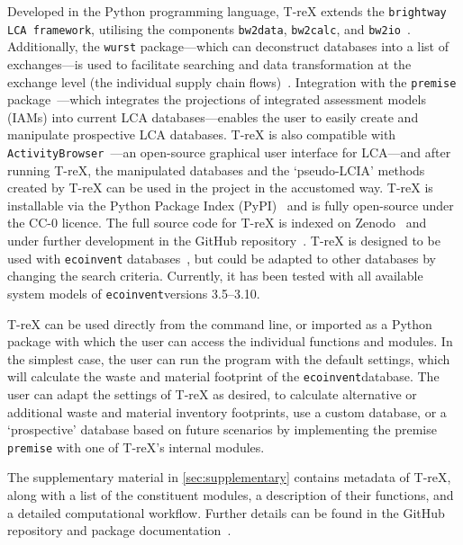 \documentclass[a4paper,fleqn]{cas-dc}
\begin{document}
Developed in the Python programming language, T-reX extends the \texttt{brightway LCA framework}, utilising the components \texttt{bw2data}, \texttt{bw2calc}, and \texttt{bw2io}~\citep{mutel2017brightway}. Additionally, the \texttt{wurst} package---which can deconstruct databases into a list of exchanges---is used to facilitate searching and data transformation at the exchange level (the individual supply chain flows)~\citep{mutel2017wurst}. Integration with the \texttt{premise} package~\citep{sacchi2022premise}---which integrates the projections of integrated assessment models (IAMs) into current LCA databases---enables the user to easily create and manipulate prospective LCA databases. T-reX is also compatible with \texttt{ActivityBrowser}~\citep{steubing2020activitybrowser}---an open-source graphical user interface for LCA---and after running T-reX, the manipulated databases and the `pseudo-LCIA' methods created by T-reX can be used in the project in the accustomed way. T-reX is installable via the Python Package Index (PyPI)~\citep{mcdowall2023T-reXpipy} and is fully open-source under the CC-0 licence. The full source code for T-reX is indexed on Zenodo~\citep{mcdowall2023T-reXzenodo} and under further development in the GitHub repository~\citep{mcdowall2024T-reXgithub}. T-reX is designed to be used with \texttt{ecoinvent} databases~\citep{ecoinvent2016version3}, but could be adapted to other databases by changing the search criteria. Currently, it has been tested with all available system models of \texttt{ecoinvent}versions 3.5--3.10.

T-reX can be used directly from the command line, or imported as a Python package with which the user can access the individual functions and modules. In the simplest case, the user can run the program with the default settings, which will calculate the waste and material footprint of the \texttt{ecoinvent}database. The user can adapt the settings of T-reX as desired, to calculate alternative or additional waste and material inventory footprints, use a custom database, or a `prospective' database based on future scenarios by implementing the premise \texttt{premise} with one of T-reX's internal modules.

The supplementary material in \autoref{sec:supplementary} contains metadata of T-reX, along with a list of the constituent modules, a description of their functions, and a detailed computational workflow. Further details can be found in the GitHub repository and package documentation~\citep{mcdowall2024T-reXgithub, mcdowall2023T-reXdocs}.
\end{document}
